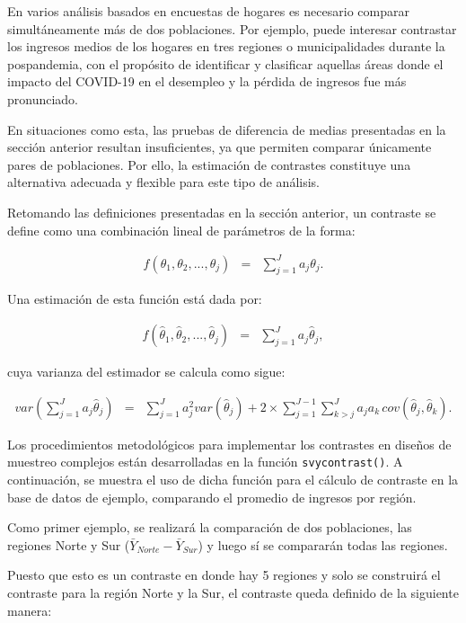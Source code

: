 \documentclass[
  spanish,
  12pt,
]{book}
\begin{document}
En varios análisis basados en encuestas de hogares es necesario comparar simultáneamente más de dos poblaciones. Por ejemplo, puede interesar contrastar los ingresos medios de los hogares en tres regiones o municipalidades durante la pospandemia, con el propósito de identificar y clasificar aquellas áreas donde el impacto del COVID-19 en el desempleo y la pérdida de ingresos fue más pronunciado.

En situaciones como esta, las pruebas de diferencia de medias presentadas en la sección anterior resultan insuficientes, ya que permiten comparar únicamente pares de poblaciones. Por ello, la estimación de contrastes constituye una alternativa adecuada y flexible para este tipo de análisis.

Retomando las definiciones presentadas en la sección anterior, un contraste se define como una combinación lineal de parámetros de la forma:

\begin{eqnarray*}
f\left(\theta _{1},\theta_{2},...,\theta_{j}\right) & = & \sum_{j=1}^{J}a_{j}\theta_{j}.
\end{eqnarray*}

Una estimación de esta función está dada por:

\begin{eqnarray*}
f\left(\hat{\theta}_{1},\hat{\theta}_{2},...,\hat{\theta}_{j}\right) & = & \sum_{j=1}^{J}a_{j}\hat{\theta}_{j},
\end{eqnarray*}

cuya varianza del estimador se calcula como sigue:

\begin{eqnarray*}
var\left(\sum_{j=1}^{J}a_{j}\hat{\theta}_{j}\right) & = & \sum_{j=1}^{J}a_{j}^{2}var\left(\hat{\theta}_{j}\right)+2\times\sum_{j=1}^{J-1}\sum_{k>j}^{J}a_{j}a_{k}\,cov\left(\hat{\theta}_{j},\hat{\theta}_{k}\right).
\end{eqnarray*}

Los procedimientos metodológicos para implementar los contrastes en diseños de muestreo complejos están desarrolladas en la función \texttt{svycontrast()}. A continuación, se muestra el uso de dicha función para el cálculo de contraste en la base de datos de ejemplo, comparando el promedio de ingresos por región.

Como primer ejemplo, se realizará la comparación de dos poblaciones, las regiones Norte y Sur (\(\bar{Y}_{Norte} - \bar{Y}_{Sur}\)) y luego sí se compararán todas las regiones.

Puesto que esto es un contraste en donde hay 5 regiones y solo se construirá el contraste para la región Norte y la Sur, el contraste queda definido de la siguiente manera:
\end{document}
